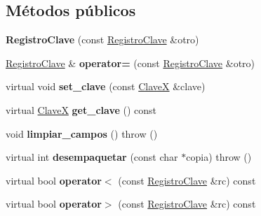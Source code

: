 \subsection*{\-Métodos públicos}
\begin{DoxyCompactItemize}
\item 
\hypertarget{class_registro_clave_ada72bd20bab6f75c37080e457cde4bf8}{{\bfseries \-Registro\-Clave} (const \hyperlink{class_registro_clave}{\-Registro\-Clave} \&otro)}\label{class_registro_clave_ada72bd20bab6f75c37080e457cde4bf8}

\item 
\hypertarget{class_registro_clave_ab8549c5ceb11879586af48b2ce1c5a0f}{\hyperlink{class_registro_clave}{\-Registro\-Clave} \& {\bfseries operator=} (const \hyperlink{class_registro_clave}{\-Registro\-Clave} \&otro)}\label{class_registro_clave_ab8549c5ceb11879586af48b2ce1c5a0f}

\item 
\hypertarget{class_registro_clave_aca9832f52c3bc044529657e74d8c2f47}{virtual void {\bfseries set\-\_\-clave} (const \hyperlink{class_clave_x}{\-Clave\-X} \&clave)}\label{class_registro_clave_aca9832f52c3bc044529657e74d8c2f47}

\item 
\hypertarget{class_registro_clave_af40da2bccba4eebabd03995837adb769}{virtual \hyperlink{class_clave_x}{\-Clave\-X} {\bfseries get\-\_\-clave} () const }\label{class_registro_clave_af40da2bccba4eebabd03995837adb769}

\item 
\hypertarget{class_registro_clave_af5b281c6118028f16862aed82849430e}{void {\bfseries limpiar\-\_\-campos} ()  throw ()}\label{class_registro_clave_af5b281c6118028f16862aed82849430e}

\item 
\hypertarget{class_registro_clave_af0782f98791b0e34d7fd8caac9c59044}{virtual int {\bfseries desempaquetar} (const char $\ast$copia)  throw ()}\label{class_registro_clave_af0782f98791b0e34d7fd8caac9c59044}

\item 
\hypertarget{class_registro_clave_ac3969b3069e680d2bf74c21835a245f5}{virtual bool {\bfseries operator$<$} (const \hyperlink{class_registro_clave}{\-Registro\-Clave} \&rc) const }\label{class_registro_clave_ac3969b3069e680d2bf74c21835a245f5}

\item 
\hypertarget{class_registro_clave_a9e2f5affd88ce83771c42b025e04c312}{virtual bool {\bfseries operator$>$} (const \hyperlink{class_registro_clave}{\-Registro\-Clave} \&rc) const }\label{class_registro_clave_a9e2f5affd88ce83771c42b025e04c312}


\end{DoxyCompactItemize}
